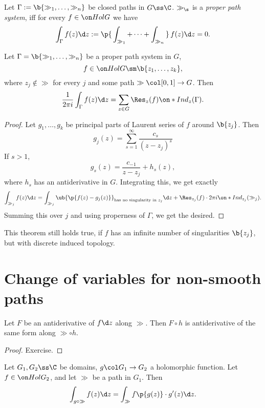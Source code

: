 \begin{definition}
  Let $\Gamma := \b{\gg_1, \dots, \gg_n}$ be closed paths in $G \ss \C$.
  $\gg_\s$ is a \emph{proper path system}, iff for every $f \in \Hol G$ we have
  $$ \int_\Gamma f(z) \d z := \p{\,\int_{\gg_1} + \dots + \int_{\gg_n}\,}\, f(z) \d z = 0. $$
\end{definition}

\begin{theorem}[on residues]
  Let $\Gamma = \b{\gg_1, \dots, \gg_n}$ be a proper path system in $G$,
  $$ f \in \Hol G \sm \b{z_1, \dots, z_k}, $$
  where $z_j \not\in \gg$ for every $j$ and some path $\gg \col [0, 1] \to G$. Then
  $$ \frac{1}{2 \pi i} \int_\Gamma f(z) \d z = \sum_{z \in G} \Res_{z}(f) \Ind_{z}(\Gamma ). $$
\end{theorem}

\begin{proof}
  Let $g_1, \dots, g_k$ be principal parts of Laurent series of $f$ around $\b{z_j}$.
  Then
  $$ g_j(z) = \sum_{s=1}^\infty \frac{c_s}{(z-z_j)^s} $$
   If $s > 1$,
   $$ g_s(z) = \frac{c_{-1}}{z-z_j} + h_s(z), $$
   where $h_s$ has an antiderivative in $G$.
   Integrating this, we get exactly
   $$ \int_{\gg_j} f(z) \d z = \int_{\gg_j} \ub{\p{f(z)-g_j(z)}}_{\text{has no singularity in $z_j$}} \d z + \Res_{z_j}(f) \cdot 2 \pi i \Ind_{z_j}(\gg_j). $$
   Summing this over $j$ and using properness of $\Gamma$, we get the desired.
\end{proof}

\begin{remark}
  This theorem still holds true, if $f$ has an infinite number of singularities $\b{z_j}$, but with discrete induced topology.  
\end{remark}

\section{Change of variables for non-smooth paths}

\begin{lemma}
  Let $F$ be an antiderivative of $f \d z$ along $\gg$.
  Then $F \circ h$ is antiderivative of the same form along $\gg \circ h$.
\end{lemma}

\begin{proof}
  Exercise.
\end{proof}

\begin{lemma}
  Let $G_1, G_2 \ss \C$ be domains, $g \col G_1 \to G_2$ a holomorphic function.
  Let $f \in \Hol G_2$,  and let $\gg$ be a path in $G_1$.
  Then
  $$ \int_{g \circ \gg} f(z) \d z = \int_\gg f \p{g(z)}   \cdot g'(z) \d z. $$
\end{lemma}


